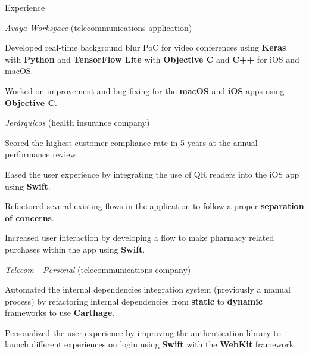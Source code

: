 \documentclass{curriculum}
\begin{document}
\begin{cvsection}{Experience}
\begin{sectionitemlist}
        \item{\textit{Avaya Workspace} (telecommunications application)}
            \begin{sectionitemlist}
            \item{
                Developed real-time background blur PoC for video conferences using
                \textbf{Keras} with \textbf{Python} and \textbf{TensorFlow Lite}
                with \textbf{Objective C} and \textbf{C++} for iOS and macOS.
            }
            \item{
                Worked on improvement and bug-fixing for the \textbf{macOS}
                and \textbf{iOS} apps using \textbf{Objective C}.
            }
            \end{sectionitemlist}

        \item{\textit{Jerárquicos} (health insurance company)}
            \begin{sectionitemlist}
            \item{
                Scored the highest customer compliance rate
                in 5 years at the annual performance review.
            }
            \item{
                Eased the user experience by integrating the use of
                QR readers into the iOS app using \textbf{Swift}.
            }
            \item{
                Refactored several existing flows in the application
                to follow a proper \textbf{separation of concerns}.
            }
            \item {
                Increased user interaction by developing a flow to make pharmacy
                related purchases within the app using \textbf{Swift}.
            }
            \end{sectionitemlist}

        \item{\textit{Telecom - Personal} (telecommunications company)}
            \begin{sectionitemlist}
            \item{
                Automated the internal dependencies integration system
                (previously a manual process) by refactoring internal dependencies
                from \textbf{static} to \textbf{dynamic} frameworks to use \textbf{Carthage}.
            }
            \item{
                Personalized the user experience by improving the authentication
                library to launch different experiences on login using
                \textbf{Swift} with the \textbf{WebKit} framework.
            }
            \end{sectionitemlist}


\end{sectionitemlist}
\end{cvsection}
\end{document}
